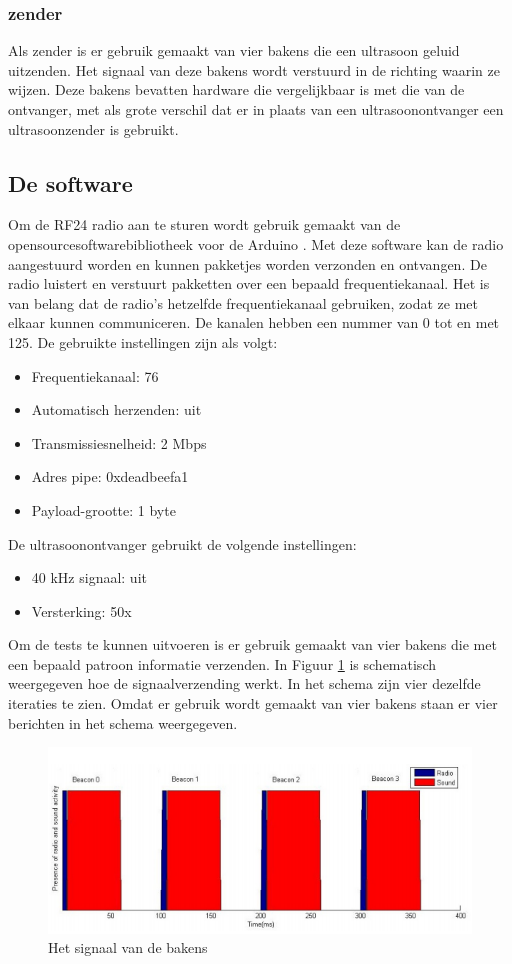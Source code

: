 \documentclass{article}
\begin{document}
\subsubsection{zender}
Als zender is er gebruik gemaakt van vier bakens die een ultrasoon geluid uitzenden. Het signaal van deze bakens wordt verstuurd in de richting waarin ze wijzen. Deze bakens bevatten hardware die vergelijkbaar is met die van de ontvanger, met als grote verschil dat er in plaats van een ultrasoonontvanger een ultrasoonzender is gebruikt.

\subsection{De software}
Om de RF24 radio aan te sturen wordt gebruik gemaakt van de opensourcesoftwarebibliotheek voor de Arduino \cite{rf24}. Met deze software kan de radio aangestuurd worden en kunnen pakketjes worden verzonden en ontvangen. De radio luistert en verstuurt pakketten over een bepaald frequentiekanaal. Het is van belang dat de radio's hetzelfde frequentiekanaal gebruiken, zodat ze met elkaar kunnen communiceren. De kanalen hebben een nummer van 0 tot en met 125. De gebruikte instellingen zijn als volgt:
\begin{itemize}
	\item Frequentiekanaal: 76 
	\item Automatisch herzenden: uit
	\item Transmissiesnelheid: 2 Mbps
	\item Adres pipe: 0xdeadbeefa1
	\item Payload-grootte: 1 byte
\end{itemize}
De ultrasoonontvanger gebruikt de volgende instellingen:
\begin{itemize}
	\item 40 kHz signaal: uit
	\item Versterking: 50x
\end{itemize}
Om de tests te kunnen uitvoeren is er gebruik gemaakt van vier bakens die met een bepaald patroon informatie verzenden. In Figuur \ref{uitzenden_bakens} is schematisch weergegeven hoe de signaalverzending werkt. In het schema zijn vier dezelfde iteraties te zien. Omdat er gebruik wordt gemaakt van vier bakens staan er vier berichten in het schema weergegeven. 
\begin{figure}[h]
\centering\includegraphics[]{berichten_bakens.png}
\caption{Het signaal van de bakens}
\label{uitzenden_bakens}
\end{figure}
\end{document}
